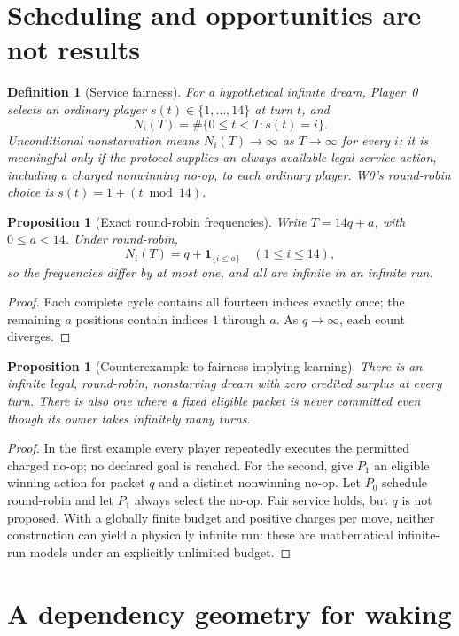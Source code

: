 \documentclass[11pt,letterpaper]{article}
\newtheorem{proposition}[theorem]{Proposition}
\newtheorem{definition}[theorem]{Definition}
\begin{document}
\section{Scheduling and opportunities are not results}\label{gl-first-W1-s4}
\begin{definition}[Service fairness]
For a hypothetical infinite dream, Player~0 selects an ordinary player $s(t)\in\{1,\ldots,14\}$ at turn $t$, and
\[
N_i(T)=\#\{0\le t<T:s(t)=i\}.
\]
Unconditional nonstarvation means $N_i(T)\to\infty$ as $T\to\infty$ for every $i$; it is meaningful only if the protocol supplies an always available legal service action, including a charged nonwinning no-op, to each ordinary player. W0's round-robin choice is $s(t)=1+(t\bmod14)$.
\end{definition}
\begin{proposition}[Exact round-robin frequencies]
Write $T=14q+a$, with $0\le a<14$. Under round-robin,
\[
N_i(T)=q+\mathbf1_{\{i\le a\}}\quad(1\le i\le14),
\]
so the frequencies differ by at most one, and all are infinite in an infinite run.
\end{proposition}
\begin{proof}Each complete cycle contains all fourteen indices exactly once; the remaining $a$ positions contain indices $1$ through $a$. As $q\to\infty$, each count diverges.\end{proof}
\begin{proposition}[Counterexample to fairness implying learning]\label{prop:fair-no-learning}
There is an infinite legal, round-robin, nonstarving dream with zero credited surplus at every turn. There is also one where a fixed eligible packet is never committed even though its owner takes infinitely many turns.
\end{proposition}
\begin{proof}
In the first example every player repeatedly executes the permitted charged no-op; no declared goal is reached. For the second, give $P_1$ an eligible winning action for packet $q$ and a distinct nonwinning no-op. Let $P_0$ schedule round-robin and let $P_1$ always select the no-op. Fair service holds, but $q$ is not proposed. With a globally finite budget and positive charges per move, neither construction can yield a physically infinite run: these are mathematical infinite-run models under an explicitly unlimited budget.
\end{proof}

\section{A dependency geometry for waking}\label{gl-first-W1-s5}
\end{document}
